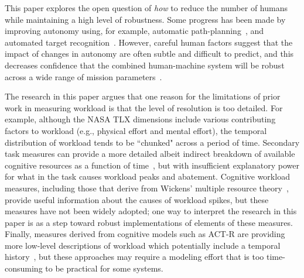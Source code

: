 This paper explores the open question of {\em how} to reduce the number of humans while maintaining a high level of robustness.  Some progress has been made by improving autonomy using, for example, automatic path-planning~\cite{WongBourgaultFurukawa2005,878915,pettersson2006probabilistic,QuigleyBarberEtAl2005,NelsonBarberMcLainBeard2006}, and automated target recognition~\cite{MorseEnghGoodrich2010,dasgupta2008multiagent,barber2006vision}. However, careful human factors suggest that the impact of changes in autonomy are often subtle and difficult to predict, and this decreases confidence that the combined human-machine system will be robust across a wide range of mission parameters~\cite{KaberEndsley2004,chen2011supervisory,chen2007human}.

The research in this paper argues that one reason for the limitations of prior work in measuring workload is that the level of resolution is too detailed.  For example, although the NASA TLX dimensions include various contributing factors to workload (e.g., physical effort and mental effort), the temporal distribution of workload tends to be ``chunked" across a period of time.  Secondary task measures can provide a more detailed albeit indirect breakdown of available cognitive resources as a function of time~\cite{kaber1999adaptive}, but with insufficient explanatory power for what in the task causes workload peaks and abatement.  Cognitive workload measures, including those that derive from Wickens' multiple resource theory~\cite{wickens2002multiple}, provide useful information about the causes of workload spikes, but these measures have not been widely adopted; one way to interpret the research in this paper is as a step toward robust implementations of elements of these measures.  Finally, measures derived from cognitive models such as ACT-R are providing more low-level descriptions of workload which potentially include a temporal history~\cite{lebiere2013cognitive}, but these approaches may require a modeling effort that is too time-consuming to be practical for some systems.

